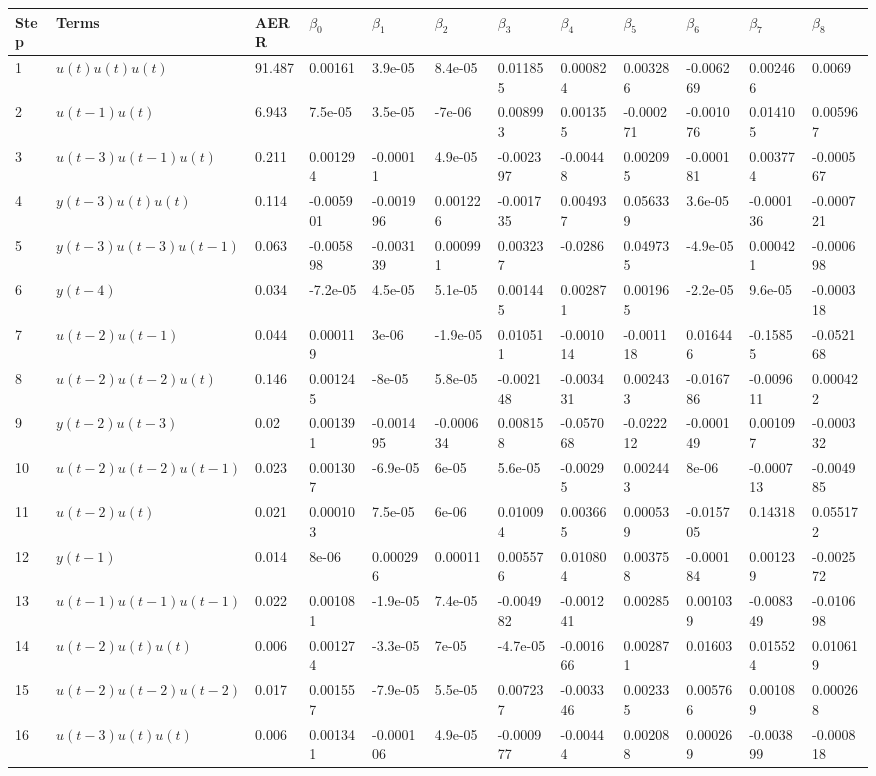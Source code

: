 \begin{tabular}{llllllllllll}
Step & Terms & AERR & $\beta_{0}$ & $\beta_{1}$ & $\beta_{2}$ & $\beta_{3}$ & $\beta_{4}$ & $\beta_{5}$ & $\beta_{6}$ & $\beta_{7}$ & $\beta_{8}$ \\ 
\hline 
1 & $u(t)u(t)u(t)$ & 91.487 & 0.00161 & 3.9e-05 & 8.4e-05 & 0.011855 & 0.000824 & 0.003286 & -0.006269 & 0.002466 & 0.0069 \\ 
2 & $u(t-1)u(t)$ & 6.943 & 7.5e-05 & 3.5e-05 & -7e-06 & 0.008993 & 0.001355 & -0.000271 & -0.001076 & 0.014105 & 0.005967 \\ 
3 & $u(t-3)u(t-1)u(t)$ & 0.211 & 0.001294 & -0.00011 & 4.9e-05 & -0.002397 & -0.00448 & 0.002095 & -0.000181 & 0.003774 & -0.000567 \\ 
4 & $y(t-3)u(t)u(t)$ & 0.114 & -0.005901 & -0.001996 & 0.001226 & -0.001735 & 0.004937 & 0.056339 & 3.6e-05 & -0.000136 & -0.000721 \\ 
5 & $y(t-3)u(t-3)u(t-1)$ & 0.063 & -0.005898 & -0.003139 & 0.000991 & 0.003237 & -0.0286 & 0.049735 & -4.9e-05 & 0.000421 & -0.000698 \\ 
6 & $y(t-4)$ & 0.034 & -7.2e-05 & 4.5e-05 & 5.1e-05 & 0.001445 & 0.002871 & 0.001965 & -2.2e-05 & 9.6e-05 & -0.000318 \\ 
7 & $u(t-2)u(t-1)$ & 0.044 & 0.000119 & 3e-06 & -1.9e-05 & 0.010511 & -0.001014 & -0.001118 & 0.016446 & -0.15855 & -0.052168 \\ 
8 & $u(t-2)u(t-2)u(t)$ & 0.146 & 0.001245 & -8e-05 & 5.8e-05 & -0.002148 & -0.003431 & 0.002433 & -0.016786 & -0.009611 & 0.000422 \\ 
9 & $y(t-2)u(t-3)$ & 0.02 & 0.001391 & -0.001495 & -0.000634 & 0.008158 & -0.057068 & -0.022212 & -0.000149 & 0.001097 & -0.000332 \\ 
10 & $u(t-2)u(t-2)u(t-1)$ & 0.023 & 0.001307 & -6.9e-05 & 6e-05 & 5.6e-05 & -0.00295 & 0.002443 & 8e-06 & -0.000713 & -0.004985 \\ 
11 & $u(t-2)u(t)$ & 0.021 & 0.000103 & 7.5e-05 & 6e-06 & 0.010094 & 0.003665 & 0.000539 & -0.015705 & 0.14318 & 0.055172 \\ 
12 & $y(t-1)$ & 0.014 & 8e-06 & 0.000296 & 0.00011 & 0.005576 & 0.010804 & 0.003758 & -0.000184 & 0.001239 & -0.002572 \\ 
13 & $u(t-1)u(t-1)u(t-1)$ & 0.022 & 0.001081 & -1.9e-05 & 7.4e-05 & -0.004982 & -0.001241 & 0.00285 & 0.001039 & -0.008349 & -0.010698 \\ 
14 & $u(t-2)u(t)u(t)$ & 0.006 & 0.001274 & -3.3e-05 & 7e-05 & -4.7e-05 & -0.001666 & 0.002871 & 0.01603 & 0.015524 & 0.010619 \\ 
15 & $u(t-2)u(t-2)u(t-2)$ & 0.017 & 0.001557 & -7.9e-05 & 5.5e-05 & 0.007237 & -0.003346 & 0.002335 & 0.005766 & 0.001089 & 0.000268 \\ 
16 & $u(t-3)u(t)u(t)$ & 0.006 & 0.001341 & -0.000106 & 4.9e-05 & -0.000977 & -0.00444 & 0.002088 & 0.000269 & -0.003899 & -0.000818 \\ 
\hline 
\end{tabular}